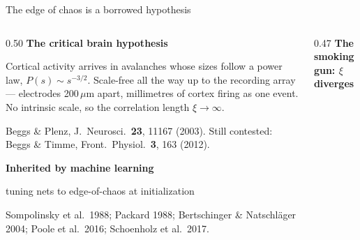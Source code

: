 \documentclass[aspectratio=169,10pt]{beamer}
\newcommand{\srcnote}[1]{{\footnotesize\color{muted}#1}}
\begin{document}
\begin{frame}{The edge of chaos is a borrowed hypothesis}
  \begingroup
  \small
  \begin{columns}[T,onlytextwidth]
    \begin{column}{0.50\textwidth}
      {\color{forest}\bfseries The critical brain hypothesis}

      \vspace{0.10em}
      Cortical activity arrives in avalanches whose sizes follow a power
      law, \(P(s)\sim s^{-3/2}\). Scale-free all the way up to the
      recording array --- electrodes 200\,\(\mu\)m apart, millimetres of
      cortex firing as one event. No intrinsic scale, so the correlation
      length \(\xi\to\infty\).

      \vspace{0.15em}
      \srcnote{Beggs \& Plenz, J.\ Neurosci.\ \textbf{23}, 11167 (2003).
      Still contested: Beggs \& Timme, Front.\ Physiol.\ \textbf{3}, 163
      (2012).}

      \vspace{0.55em}
      {\color{forest}\bfseries Inherited by machine learning}

      \vspace{0.10em}
      {\footnotesize
      tuning nets to edge-of-chaos at initialization}

      \vspace{0.15em}
      \srcnote{Sompolinsky et al.\ 1988; Packard 1988;
      Bertschinger \& Natschl\"ager 2004; Poole et al.\ 2016;
      Schoenholz et al.\ 2017.}
    \end{column}

    \begin{column}{0.47\textwidth}
      \centering
      {\color{forest}\bfseries The smoking gun: \(\xi\) diverges}


\end{column}
\end{columns}
\end{frame}
\end{document}
